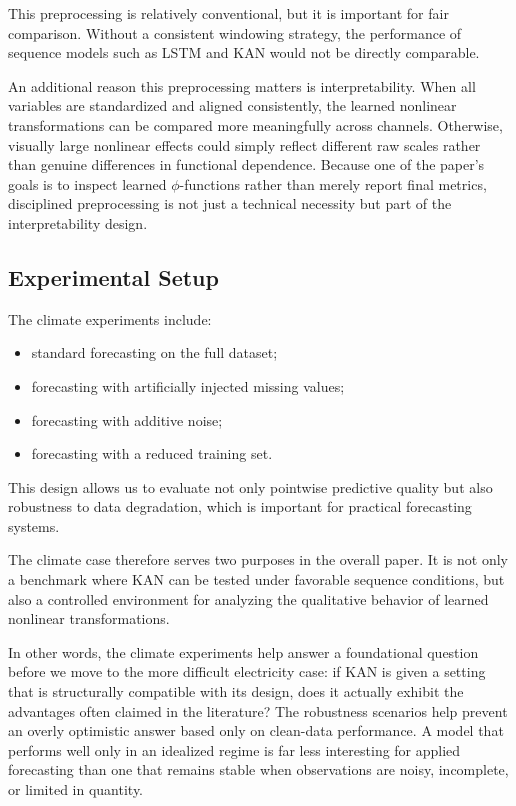 \documentclass[10pt,conference,onecolumn]{IEEEtran}
\begin{document}
This preprocessing is relatively conventional, but it is important for fair comparison. Without a consistent windowing strategy, the performance of sequence models such as LSTM and KAN would not be directly comparable.

An additional reason this preprocessing matters is interpretability. When all variables are standardized and aligned consistently, the learned nonlinear transformations can be compared more meaningfully across channels. Otherwise, visually large nonlinear effects could simply reflect different raw scales rather than genuine differences in functional dependence. Because one of the paper's goals is to inspect learned $\phi$-functions rather than merely report final metrics, disciplined preprocessing is not just a technical necessity but part of the interpretability design.

\subsection{Experimental Setup}

The climate experiments include:
\begin{itemize}
    \item standard forecasting on the full dataset;
    \item forecasting with artificially injected missing values;
    \item forecasting with additive noise;
    \item forecasting with a reduced training set.
\end{itemize}

This design allows us to evaluate not only pointwise predictive quality but also robustness to data degradation, which is important for practical forecasting systems.

The climate case therefore serves two purposes in the overall paper. It is not only a benchmark where KAN can be tested under favorable sequence conditions, but also a controlled environment for analyzing the qualitative behavior of learned nonlinear transformations.

In other words, the climate experiments help answer a foundational question before we move to the more difficult electricity case: if KAN is given a setting that is structurally compatible with its design, does it actually exhibit the advantages often claimed in the literature? The robustness scenarios help prevent an overly optimistic answer based only on clean-data performance. A model that performs well only in an idealized regime is far less interesting for applied forecasting than one that remains stable when observations are noisy, incomplete, or limited in quantity.
\end{document}
